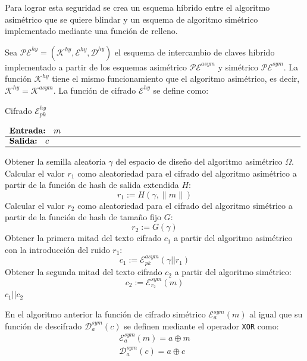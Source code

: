Para lograr esta seguridad se crea un esquema híbrido entre el algoritmo asimétrico que se quiere blindar y un esquema de algoritmo simétrico implementado mediante una función de relleno.
\newline

Sea \(\mathcal{PE}^{hy}=(\mathcal{K}^{hy},\mathcal{E}^{hy},\mathcal{D}^{hy})\) el esquema de intercambio de claves híbrido implementado a partir de los esquemas asimétrico \(\mathcal{PE}^{asym}\) y simétrico \(\mathcal{PE}^{sym}\). La función $\mathcal{K}^{hy}$ tiene el mismo funcionamiento que el algoritmo asimétrico, es decir, $\mathcal{K}^{hy}=\mathcal{K}^{asym}$. La función de cifrado \(\mathcal{E}^{hy}\) se define como:
\begin{algorithm}[H]
	\caption{Cifrado $\mathcal{E}^{hy}_{pk}$} 
	$\begin{array}{p{\textwidth}}
		\textbf{Entrada: } \(m\)\\ 
		\hline
		\textbf{Salida: } \(c\)\\ 
		\hline
	\end{array}$
	\begin{algorithmic}[1]
		\State Obtener la semilla aleatoria $\gamma$ del espacio de diseño del algoritmo asimétrico $\Omega$.
		\State Calcular el valor \(r_1\) como aleatoriedad para el cifrado del algoritmo asimétrico a partir de la función de hash de salida extendida \(H\):
		\begin{equation}
			r_1:=H(\gamma,\|m\|)
		\end{equation}
		\State Calcular el valor \(r_2\) como aleatoriedad para el cifrado del algoritmo simétrico a partir de la función de hash de tamaño fijo \(G\):
		\begin{equation}
			r_2:=G(\gamma)
		\end{equation}
		\State Obtener la primera mitad del texto cifrado \(c_1\) a partir del algoritmo asimétrico con la introducción del ruido \(r_1\):
		\begin{equation}
			c_1:=\mathcal{E}^{asym}_{pk}(\gamma||r_1)
		\end{equation}
		\State Obtener la segunda mitad del texto cifrado \(c_2\) a partir del algoritmo simétrico:
		\begin{equation}
			c_2:=\mathcal{E}^{sym}_{r_2}(m)
		\end{equation}
		\State \Return \(c_1||c_2\)
	\end{algorithmic}
\end{algorithm}

En el algoritmo anterior la función de cifrado simétrico \(\mathcal{E}^{sym}_{a}(m)\) al igual que su función de descifrado \(\mathcal{D}^{sym}_{a}(c)\) se definen mediante el operador \texttt{XOR} como:
\begin{equation}
	\begin{array}{l}
		\mathcal{E}^{sym}_{a}(m)=a\oplus m\\
		\mathcal{D}^{sym}_{a}(c)=a\oplus c
	\end{array}
\end{equation}
\newpage

